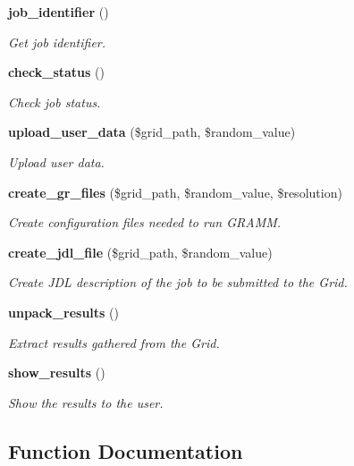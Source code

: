 \begin{CompactItemize}
{\bf job\_\-identifier} ()
\begin{CompactList}\small\item\em Get job identifier. \item\end{CompactList}\item 
{\bf check\_\-status} ()
\begin{CompactList}\small\item\em Check job status. \item\end{CompactList}\item 
{\bf upload\_\-user\_\-data} (\$grid\_\-path, \$random\_\-value)
\begin{CompactList}\small\item\em Upload user data. \item\end{CompactList}\item 
{\bf create\_\-gr\_\-files} (\$grid\_\-path, \$random\_\-value, \$resolution)
\begin{CompactList}\small\item\em Create configuration files needed to run GRAMM. \item\end{CompactList}\item 
{\bf create\_\-jdl\_\-file} (\$grid\_\-path, \$random\_\-value)
\begin{CompactList}\small\item\em Create JDL description of the job to be submitted to the Grid. \item\end{CompactList}\item 
{\bf unpack\_\-results} ()
\begin{CompactList}\small\item\em Extract results gathered from the Grid. \item\end{CompactList}\item 
{\bf show\_\-results} ()
\begin{CompactList}\small\item\em Show the results to the user. \item\end{CompactList}\end{CompactItemize}


\subsection{Function Documentation}
